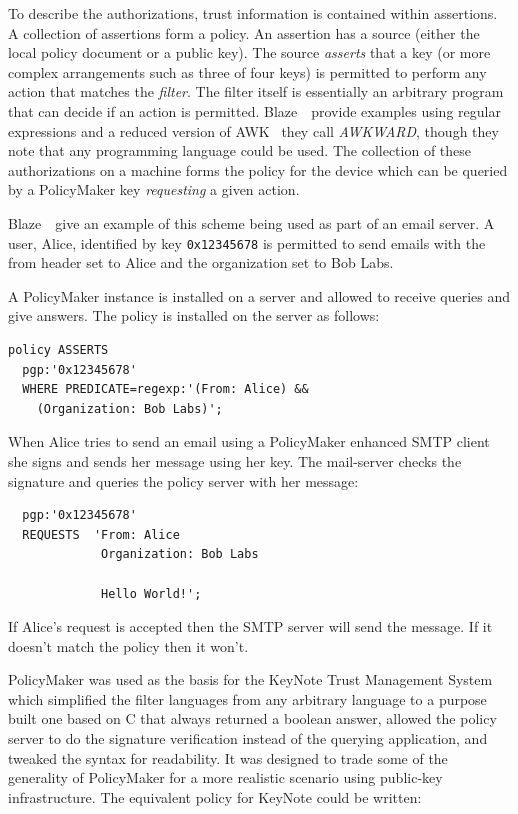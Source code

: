 \documentclass[thesis.tex]{subfiles}
\begin{document}
To describe the authorizations, trust information is contained within assertions.
A collection of assertions form a policy. An assertion has a source (either
the local policy document or a public key). The source \emph{asserts} that a key
(or more complex arrangements such as three of four keys) is permitted to
perform any action that matches the \emph{filter}. The filter itself is
essentially an arbitrary program that can decide if an action is permitted.
Blaze~\etal~provide examples using regular expressions and a reduced version of
AWK~\cite{aho_awk-pattern_1979} they call \emph{AWKWARD}, though they note that
any programming language could be used. The collection of these authorizations
on a machine forms the policy for the device which can be queried by a
PolicyMaker key \emph{requesting} a given action.

Blaze~\etal~give an example of this scheme being used as part of an email
server. A user, Alice, identified by key \texttt{0x12345678} is permitted to
send emails with the from header set to Alice and the organization set to Bob
Labs.

A PolicyMaker instance is installed on a server and allowed to receive queries and give answers.
The policy is installed on the server as follows:

\begin{lstlisting}
policy ASSERTS
  pgp:'0x12345678'
  WHERE PREDICATE=regexp:'(From: Alice) &&
    (Organization: Bob Labs)';
\end{lstlisting}

When Alice tries to send an email using a PolicyMaker enhanced SMTP
client she signs and sends her message using her key.  The mail-server
checks the signature and queries the policy server with her message:

\begin{lstlisting}
  pgp:'0x12345678'
  REQUESTS  'From: Alice
             Organization: Bob Labs

             Hello World!';
\end{lstlisting}

If Alice's request is accepted then the SMTP server will send the
message.  If it doesn't match the policy then it won't.

PolicyMaker was used as the basis for the KeyNote Trust Management
System~\cite{blaze_role_1999,blaze_keynote:_1998} which simplified the
filter languages from any arbitrary language to a purpose built one
based on C that always returned a boolean answer, allowed the policy
server to do the signature verification instead of the querying
application, and tweaked the syntax for readability.  It was designed
to trade some of the generality of PolicyMaker for a more realistic
scenario using public-key infrastructure.  The equivalent policy for KeyNote could be written:
\end{document}
